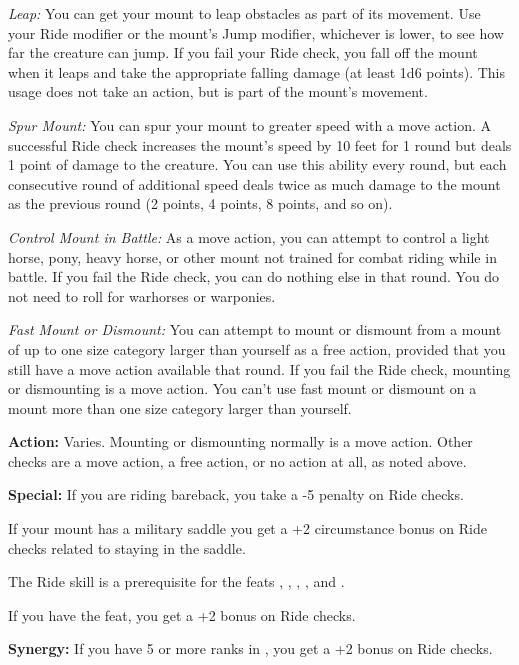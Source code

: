 \textit{Leap:} You can get your mount to leap obstacles as part of its movement. 
Use your Ride modifier or the mount's Jump modifier, whichever is lower, to see 
how far the creature can jump. If you fail your Ride check, you fall off the mount 
when it leaps and take the appropriate falling damage (at least 1d6 points). This 
usage does not take an action, but is part of the mount's movement.

\textit{Spur Mount:} You can spur your mount to greater speed with a move action. 
A successful Ride check increases the mount's speed by 10 feet for 1 round but 
deals 1 point of damage to the creature. You can use this ability every round, 
but each consecutive round of additional speed deals twice as much damage to the 
mount as the previous round (2 points, 4 points, 8 points, and so on).

\textit{Control Mount in Battle:} As a move action, you can attempt to control 
a light horse, pony, heavy horse, or other mount not trained for combat riding 
while in battle. If you fail the Ride check, you can do nothing else in that round. 
You do not need to roll for warhorses or warponies.

\textit{Fast Mount or Dismount:} You can attempt to mount or dismount from a mount 
of up to one size category larger than yourself as a free action, provided that 
you still have a move action available that round. If you fail the Ride check, 
mounting or dismounting is a move action. You can't use fast mount or dismount 
on a mount more than one size category larger than yourself.

\textbf{Action:} Varies. Mounting or dismounting normally is a move action. Other 
checks are a move action, a free action, or no action at all, as noted above.

\textbf{Special:} If you are riding bareback, you take a -5 penalty on Ride checks.

If your mount has a military saddle you get a +2 circumstance bonus on Ride checks 
related to staying in the saddle.

The Ride skill is a prerequisite for the feats , , 
, , and .

If you have the  feat, you get a +2 bonus on Ride checks.

\textbf{Synergy:} If you have 5 or more ranks in , you get a +2 bonus 
on Ride checks.
